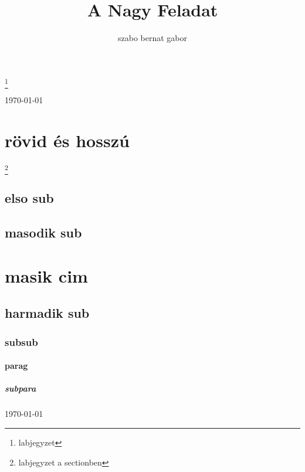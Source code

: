 \documentclass[twoside]{book}
\begin{document}
\title{A Nagy Feladat}
\author{szabo bernat gabor}
\maketitle
\hulipsum
\footnote{labjegyzet}
\tableofcontents
\pagebreak
\frenchspacing
\noindent
\bigskip
\foreignlanguage{latin}{\lipsum[2]}


\begin{flushright}
\newpage
\today

\section{rövid és hosszú} \footnote{labjegyzet a sectionben}
\subsection{elso sub}
\hulipsum[3]
\subsection{masodik sub}
\hulipsum[3]
\section{masik cim}
\subsection{harmadik sub}
\subsubsection{subsub}
\paragraph{parag}
\subparagraph{subpara}
\end{flushright}

\newpage
{}
\linespread{2}
{
\today
\blindtext[2]

}
\end{document}
